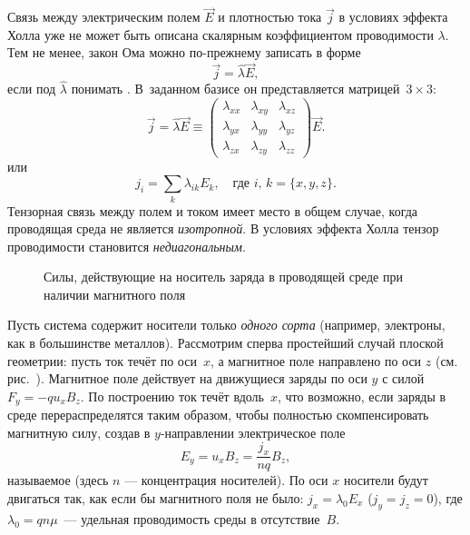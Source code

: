 
Связь между электрическим полем $\vec{E}$ и плотностью тока $\vec{j}$ в
условиях эффекта Холла уже не может быть описана скалярным коэффициентом проводимости
$\lambda$. Тем не менее, закон Ома можно по-прежнему записать
в форме
\begin{equation}
\vec{j} = \hat{\lambda} \vec{E},
\end{equation}
если под $\hat{\lambda}$
понимать . В~заданном базисе он представляется
матрицей~$3\times 3$:
\begin{equation}
    \vec{j} =\hat{\lambda}\vec{E}\equiv \left(
    \begin{matrix}
     \lambda_{xx} & \lambda_{xy} & \lambda_{xz}\\
     \lambda_{yx} & \lambda_{yy} & \lambda_{yz}\\
     \lambda_{zx} & \lambda_{zy} & \lambda_{zz}
    \end{matrix}
\right) \vec{E}.
\end{equation}
или
\begin{equation*}
    j_{i} = \sum_{k} \lambda_{ik} E_k,\quad \text{где~}i,\,k=\{x,y,z\}.
\end{equation*}
Тензорная связь между полем и током имеет место в общем случае, когда
проводящая среда не является \emph{изотропной}.
В условиях эффекта Холла тензор проводимости становится \emph{недиагональным}.


\begin{wrapfigure}{o}{0.5\textwidth}
\centering
    \caption{Силы, действующие на носитель заряда в проводящей среде
    при наличии магнитного поля}
\end{wrapfigure}

Пусть система содержит носители только \emph{одного сорта}
(например, электроны, как в большинстве металлов).
Рассмотрим сперва простейший случай плоской геометрии:
пусть ток течёт по оси~$x$, а магнитное поле направлено по оси $z$
(см. рис.~).
Магнитное поле действует на движущиеся заряды по оси $y$ с силой $F_y=-qu_xB_z$.
По построению ток течёт вдоль~$x$, что возможно,
если заряды в среде перераспределятся таким образом, чтобы полностью
скомпенсировать магнитную силу, создав в $y$-направлении электрическое поле
\begin{equation*}
E_y=u_x B_z=\frac{j_x}{nq} B_z,
\end{equation*}
называемое  (здесь $n$ --- концентрация носителей).
По оси $x$ носители будут двигаться так, как если бы магнитного поля не было:
$j_x=\lambda_0 E_x$ ($j_y=j_z=0$), где $\lambda_0 = qn\mu$~---
удельная проводимость среды в отсутствие~$B$.

